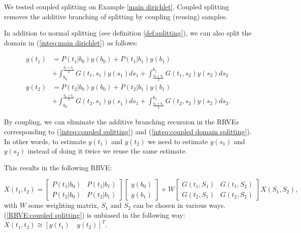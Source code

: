 \documentclass[a4paper,12pt]{article}
\begin{document}
We tested coupled splitting on Example \ref{main dirichlet}.
Coupled splitting removes the additive branching of splitting by coupling (reusing)
samples.

\begin{example} \label{ex:coupled splitting}
  In addition to normal splitting (see definition \ref{def:splitting}),
  we can also split the domain in (\ref{inteq:main dirichlet})
  as follows:

  \begin{align}\label{inteq:coupled splitting}
    y(t_1) & = P(t_1|b_{0}) y(b_{0}) + P(t_1|b_{1}) y(b_{1})                \\
           & + \int_{b_{0}}^{\frac{b_{0}+b_{1}}{2}} G(t_1,s_1)y(s_1) ds_1 +
    \int_{\frac{b_{0}+b_{1}}{2}}^{b_{1}} G(t_1,s_2)y(s_2) ds_2              \\ \label{inteq:coupled domain splitting}
    y(t_2) & = P(t_2|b_{0}) y(b_{0}) + P(t_2|b_{1}) y(b_{1})                \\
           & + \int_{b_{0}}^{\frac{b_{0}+b_{1}}{2}} G(t_2,s_1)y(s_1) ds_1
    +\int_{\frac{b_{0}+b_{1}}{2}}^{b_{1}} G(t_2,s_2)y(s_2) ds_2.
  \end{align}

  By coupling, we can eliminate the additive branching recursion
  in the RRVEs corresponding to (\ref{inteq:coupled splitting})
  and (\ref{inteq:coupled domain splitting}). In other words,
  to estimate $y(t_1)$ and $y(t_2)$ we need to estimate $y(s_1)$ and $y(s_2)$
  instead of doing it twice we reuse the same estimate.

  This results in the following RRVE:

  \begin{equation} \label{RRVE:coupled splitting}
    X(t_{1},t_{2})=
    \begin{bmatrix}
      P(t_{1}|b_{0}) & P(t_{1}|b_{1}) \\
      P(t_{2}|b_{0}) & P(t_{2}|b_{1})
    \end{bmatrix}
    \begin{bmatrix}
      y(b_{0}) \\
      y(b_{1})
    \end{bmatrix}
    +
    W
    \begin{bmatrix}
      G(t_{1},S_{1}) & G(t_{1},S_{2}) \\
      G(t_{2},S_{1}) & G(t_{2},S_{2})
    \end{bmatrix}
    X(S_{1},S_{2}),
  \end{equation}
  with $W$ some weighting matrix,
  $S_{1}$ and $S_{2}$ can be chosen
  in various ways. (\ref{RRVE:coupled splitting}) is unbiased in the following way:
  $X(t_{1},t_{2}) \cong [y(t_{1}) \quad y(t_{2})]^{T}$.

\end{example}
\end{document}
